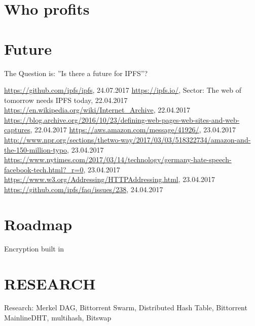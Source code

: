 \documentclass[a4paper,11pt, oneside]{report}
\theoremstyle{definition}
\begin{document}
\chapter{Who profits}

\chapter{Future}
The Question is: ''Is there a future for IPFS''?



\begin{thebibliography}{1}
 \url{https://github.com/ipfs/ipfs}, 24.07.2017
 \url{https://ipfs.io/}, Sector: The web of tomorrow needs IPFS today, 22.04.2017
 \url{https://en.wikipedia.org/wiki/Internet_Archive}, 22.04.2017
 \url{https://blog.archive.org/2016/10/23/defining-web-pages-web-sites-and-web-captures}, 22.04.2017
 \url{https://aws.amazon.com/message/41926/}, 23.04.2017
 \url{http://www.npr.org/sections/thetwo-way/2017/03/03/518322734/amazon-and-the-150-million-typo}, 23.04.2017
 \url{https://www.nytimes.com/2017/03/14/technology/germany-hate-speech-facebook-tech.html?_r=0}, 23.04.2017
 \url{https://www.w3.org/Addressing/HTTPAddressing.html}, 23.04.2017 
\url{https://github.com/ipfs/faq/issues/238}, 24.04.2017
 
\end{thebibliography}

\chapter{Roadmap}
Encryption built in

\printglossaries

\listoffigures
\chapter{RESEARCH}
Research: Merkel DAG, Bittorrent Swarm, Distributed Hash Table, Bittorrent MainlineDHT, multihash, Bitswap
\end{document}
